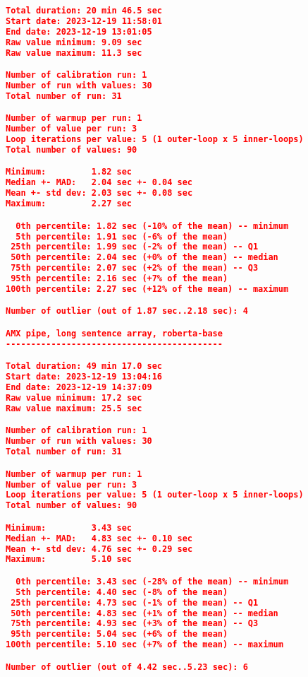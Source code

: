 \begin{lstlisting}[language=json]
Total duration: 20 min 46.5 sec
Start date: 2023-12-19 11:58:01
End date: 2023-12-19 13:01:05
Raw value minimum: 9.09 sec
Raw value maximum: 11.3 sec

Number of calibration run: 1
Number of run with values: 30
Total number of run: 31

Number of warmup per run: 1
Number of value per run: 3
Loop iterations per value: 5 (1 outer-loop x 5 inner-loops)
Total number of values: 90

Minimum:         1.82 sec
Median +- MAD:   2.04 sec +- 0.04 sec
Mean +- std dev: 2.03 sec +- 0.08 sec
Maximum:         2.27 sec

  0th percentile: 1.82 sec (-10% of the mean) -- minimum
  5th percentile: 1.91 sec (-6% of the mean)
 25th percentile: 1.99 sec (-2% of the mean) -- Q1
 50th percentile: 2.04 sec (+0% of the mean) -- median
 75th percentile: 2.07 sec (+2% of the mean) -- Q3
 95th percentile: 2.16 sec (+7% of the mean)
100th percentile: 2.27 sec (+12% of the mean) -- maximum

Number of outlier (out of 1.87 sec..2.18 sec): 4

AMX pipe, long sentence array, roberta-base
-------------------------------------------

Total duration: 49 min 17.0 sec
Start date: 2023-12-19 13:04:16
End date: 2023-12-19 14:37:09
Raw value minimum: 17.2 sec
Raw value maximum: 25.5 sec

Number of calibration run: 1
Number of run with values: 30
Total number of run: 31

Number of warmup per run: 1
Number of value per run: 3
Loop iterations per value: 5 (1 outer-loop x 5 inner-loops)
Total number of values: 90

Minimum:         3.43 sec
Median +- MAD:   4.83 sec +- 0.10 sec
Mean +- std dev: 4.76 sec +- 0.29 sec
Maximum:         5.10 sec

  0th percentile: 3.43 sec (-28% of the mean) -- minimum
  5th percentile: 4.40 sec (-8% of the mean)
 25th percentile: 4.73 sec (-1% of the mean) -- Q1
 50th percentile: 4.83 sec (+1% of the mean) -- median
 75th percentile: 4.93 sec (+3% of the mean) -- Q3
 95th percentile: 5.04 sec (+6% of the mean)
100th percentile: 5.10 sec (+7% of the mean) -- maximum

Number of outlier (out of 4.42 sec..5.23 sec): 6
\end{lstlisting}

